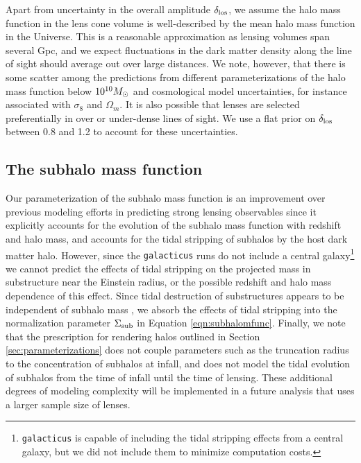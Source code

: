 Apart from uncertainty in the overall amplitude $\delta_{\rm{los}}$, we assume the halo mass function in the lens cone volume is well-described by the mean halo mass function in the Universe. This is a reasonable approximation as lensing volumes span several Gpc, and we expect fluctuations in the dark matter density along the line of sight should average out over large distances. We note, however, that there is some scatter among the predictions from different parameterizations of the halo mass function below $10^{10}{M_{\odot}}$ \citep[e.g.][]{Despali++16} and cosmological model uncertainties, for instance associated with $\sigma_8$ and $\Omega_m$. It is also possible that lenses are selected preferentially in over or under-dense lines of sight. We use a flat prior on $\delta_{\rm{los}}$ between 0.8 and 1.2 to account for these uncertainties.

\subsection{The subhalo mass function}
\label{ssec:submfuncassumptions}
Our parameterization of the subhalo mass function is an improvement over previous modeling efforts in predicting strong lensing observables since it explicitly accounts for the evolution of the subhalo mass function with redshift and halo mass, and accounts for the tidal stripping of subhalos by the host dark matter halo. However, since the {\tt{galacticus}} runs do not include a central galaxy\footnote{{\tt{galacticus}} is capable of including the tidal stripping effects from a central galaxy, but we did not include them to minimize computation costs.} we cannot predict the effects of tidal stripping on the projected mass in substructure near the Einstein radius, or the possible redshift and halo mass dependence of this effect. Since tidal destruction of substructures appears to be independent of subhalo mass \citep{GK++17,Graus++18}, we absorb the effects of tidal stripping into the normalization parameter $\Sigma_{\rm{sub}}$ in Equation \ref{eqn:subhalomfunc}. Finally, we note that the prescription for rendering halos outlined in Section \ref{sec:parameterizations} does not couple parameters such as the truncation radius to the concentration of subhalos at infall, and does not model the tidal evolution of subhalos from the time of infall until the time of lensing. These additional degrees of modeling complexity will be implemented in a future analysis that uses a larger sample size of lenses.

